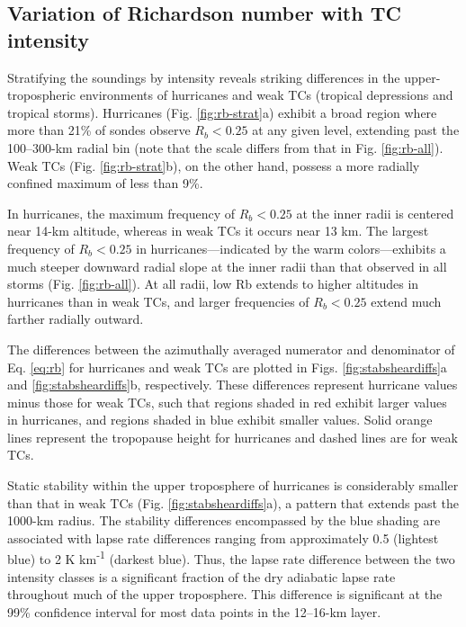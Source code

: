 \subsection{Variation of Richardson number with TC intensity}

Stratifying the soundings by intensity reveals striking differences in the upper-tropospheric environments of hurricanes and weak TCs (tropical depressions and tropical storms).
Hurricanes (Fig. \ref{fig:rb-strat}a) exhibit a broad region where more than 21\% of sondes observe $R_b < 0.25$ at any given level, extending past the 100--300-km radial bin (note that the scale differs from that in Fig. \ref{fig:rb-all}).
Weak TCs (Fig. \ref{fig:rb-strat}b), on the other hand, possess a more radially confined maximum of less than 9\%.

In hurricanes, the maximum frequency of $R_b<0.25$ at the inner radii is centered near 14-km altitude, whereas in weak TCs it occurs near 13 km.
The largest frequency of $R_b < 0.25$ in hurricanes---indicated by the warm colors---exhibits a much steeper downward radial slope at the inner radii than that observed in all storms (Fig. \ref{fig:rb-all}).
At all radii, low Rb extends to higher altitudes in hurricanes than in weak TCs, and larger frequencies of $R_b < 0.25$ extend much farther radially outward.

The differences between the azimuthally averaged numerator and denominator of Eq. \ref{eq:rb} for hurricanes and weak TCs are plotted in Figs. \ref{fig:stabsheardiffs}a and \ref{fig:stabsheardiffs}b, respectively.
These differences represent hurricane values minus those for weak TCs, such that regions shaded in red exhibit larger values in hurricanes, and regions shaded in blue exhibit smaller values.
Solid orange lines represent the tropopause height for hurricanes and dashed lines are for weak TCs.

Static stability within the upper troposphere of hurricanes is considerably smaller than that in weak TCs (Fig. \ref{fig:stabsheardiffs}a), a pattern that extends past the 1000-km radius.
The stability differences encompassed by the blue shading are associated with lapse rate differences ranging from approximately 0.5 (lightest blue) to 2 K km\textsuperscript{-1} (darkest blue).
Thus, the lapse rate difference between the two intensity classes is a significant fraction of the dry adiabatic lapse rate throughout much of the upper troposphere.
This difference is significant at the 99\% confidence interval for most data points in the 12–16-km layer.

